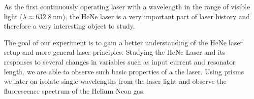 \documentclass[../main.tex]{subfiles}
\begin{document}

As the first continuously operating laser with a wavelength in the range of visible light ($\lambda \approx \SI{632.8}{\nm}$), the HeNe laser is a very important part of laser history and therefore a very interesting object to study.

The goal of our experiment is to gain a better understanding of the HeNe laser setup and more general laser principles. Studying the HeNe Laser and its responses to several changes in variables such as input current and resonator length, we are able to observe such basic properties of a the laser. Using prisms we later on isolate single wavelengths from the laser light and observe the fluorescence spectrum of the Helium Neon gas.
\end{document}
